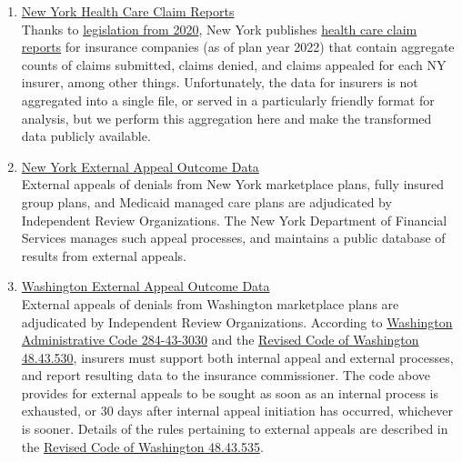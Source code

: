 \documentclass[12pt, a4paper]{report}
\begin{document}
\begin{enumerate}
	
	\item \href{https://www.dfs.ny.gov/reports_and_publications/health_care_claim_reports}{New York Health Care Claim Reports}\\
	
	Thanks to \href{https://www.nysenate.gov/legislation/laws/ISC/345}{legislation from 2020}, New York publishes \href{https://www.dfs.ny.gov/reports_and_publications/health_care_claim_reports}{health care claim reports} for insurance companies (as of plan year 2022) that contain aggregate counts of claims submitted, claims denied, and claims appealed for each NY insurer, among other things. Unfortunately, the data for insurers is not aggregated into a single file, or served in a particularly friendly format for analysis, but we perform this aggregation here and make the transformed data publicly available.\\
	
	
	\item \href{https://www.dfs.ny.gov/public-appeal/search}{New York External Appeal Outcome Data}\\
	
	External appeals of denials from New York marketplace plans, fully insured group plans, and Medicaid managed care plans are adjudicated by Independent Review Organizations. The New York Department of Financial Services manages such appeal processes, and maintains a public database of results from external appeals.\\
	
	
	\item \href{https://fortress.wa.gov/oic/consumertoolkit/Search.aspx?searchtype=indrev}{Washington External Appeal Outcome Data}\\
	
	External appeals of denials from Washington marketplace plans are adjudicated by Independent Review Organizations. According to \href{https://apps.leg.wa.gov/wac/default.aspx?cite=284-43-3030}{Washington Administrative Code 284-43-3030} and the \href{https://app.leg.wa.gov/RCW/default.aspx?cite=48.43.530}{Revised Code of Washington 48.43.530}, insurers must support both internal appeal and external processes, and report resulting data to the insurance commissioner. The code above provides for external appeals to be sought as soon as an internal process is exhausted, or 30 days after internal appeal initiation has occurred, whichever is sooner. Details of the rules pertaining to external appeals are described in the \href{https://app.leg.wa.gov/rcw/default.aspx?cite=48.43.535}{Revised Code of Washington 48.43.535}.\\
	

\end{enumerate}
\end{document}
